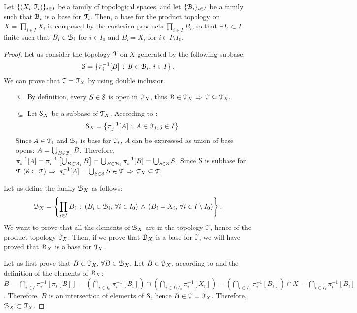 \begin{theorem}
	\label{th:product-topology-base}
	Let $\{(X_i, \T_i)\}_{i\in I}$ be a family of topological spaces, and let $\{\B_i\}_{i\in I}$ be
	a family such that $\B_i$ is a base for $\T_i$. Then, a base for the product topology
	on $X=\prod_{i\in I} X_i$ is composed by the cartesian products $\prod_{i\in I}B_i$,
	so that $\exists I_0\subset I$ finite such that
	$B_i\in \B_i$ for $i\in I_0$ and $B_i=X_i$ for $i\in I\setminus I_0$.
\end{theorem}

\begin{proof}Let us consider the topology $\T$ on $X$ generated by the following subbase:
	$$
	\S = \setdef{\pi^{-1}_i[B]}{B\in\B_i,\,i\in I}.
	$$
	We can prove that $\T=\T_X$ by using double inclusion.
	\begin{itemize}
		\item[$\boxed{\subseteq}$] By definition, every $S\in \S$ is open in $\T_X$, thus $\B\in \T_X$ $\Then$ $\T\subseteq \T_X$.
		\item[$\boxed{\subseteq}$] Let $\S_X$ be a subbase of $\T_X$. According to :
		$$
			\S_X = \setdef{\pi^{-1}_j[A]}{A\in\T_j, j\in I}.
		$$
		Since $A\in \T_i$ and $\B_i$ is base for $\T_i$, $A$ can be expressed as union of
		base opens: $A=\bigcup_{B\in \B_i} B$. Therefore,
		$\pi^{-1}_i[A] = \pi^{-1}_i\left[\bigcup_{B\in \B_i} B\right] = \bigcup_{B\in \B_i} \pi^{-1}_i[B] = \bigcup_{S\in\S}S$.
		Since $\S$ is subbase for $\T$ ($\S\subset \T$) $\Then$ $\pi^{-1}_i[A]=\bigcup_{S\in\S}S\in \T$ $\Then$ $\T_X\subseteq \T$.
	\end{itemize}
	Let us define the family $\B_X$ as follows:
	$$
		\B_X = \setdef{\prod_{i\in I}B_i}{\left(B_i\in\B_i,\,\forall i\in I_0\right)\,\land\,\left(B_i=X_i,\,\forall i\in I\setminus I_0\right)}.
	$$
	We want to prove that all the elements of $\B_X$ are in the topology $\T$, hence of the product topology $\T_X$.
	Then, if we prove that $\B_X$ is a base for $\T$, we will have proved that $\B_X$ is a base for $\T_X$.

	Let us first prove that $B\in \T_X$, $\forall B\in \B_X$. Let $B\in\B_X$, according to  and the definition of the elements of $\B_X$:
	$B=\bigcap_{i\in I}\pi^{-1}_i[\pi_i[B]] = \left(\bigcap_{i\in I_0}\pi^{-1}_i[B_i]\right)\cap \left(\bigcap_{i\in I\setminus I_0}\pi^{-1}_i[X_i]\right)=\left(\bigcap_{i\in I_0}\pi^{-1}_i[B_i]\right)\cap X=\bigcap_{i\in I_0} \pi^{-1}_i[B_i]$.
	Therefore, $B$ is an intersection of elements of $\S$, hence $B\in \T = \T_X$. Therefore, $\B_X\subset \T_X$.


\end{proof}
